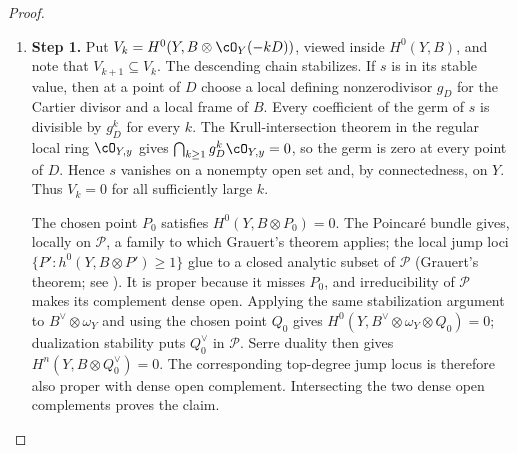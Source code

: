 \begin{proof}
\begin{enumerate}[label={$\langle1\rangle$\arabic*.},leftmargin=*]
\item 
\noindent\textbf{Step 1.} Put
  \(V_k=H^0(Y,B\otimes\cO_Y(-kD))\), viewed inside $H^0(Y,B)$, and note
  that $V_{k+1}\subseteq V_k$.  The descending chain stabilizes.  If $s$ is
  in its stable value, then at a point of $D$ choose a local defining
  nonzerodivisor $g_D$ for the Cartier divisor and a local frame of $B$.
  Every coefficient of the germ of $s$ is divisible by $g_D^k$ for every
  $k$.  The Krull-intersection theorem in the regular local ring
  $\cO_{Y,y}$ gives $\bigcap_{k\ge1}g_D^k\cO_{Y,y}=0$, so the germ is zero at
  every point of $D$.  Hence $s$ vanishes on a nonempty open set and, by
  connectedness, on $Y$.  Thus $V_k=0$ for all sufficiently large $k$.

  The chosen point $P_0$ satisfies
  $H^0(Y,B\otimes P_0)=0$.  The Poincar\'e bundle gives, locally on
$\mathcal P$, a family to which Grauert's theorem applies; the local jump
  loci $\{P':h^0(Y,B\otimes P')\ge1\}$ glue to a closed analytic subset of
  $\mathcal P$ (Grauert's theorem; see \cite{Grauert1960D,BS76push}).  It is proper because it misses $P_0$, and irreducibility of
$\mathcal P$ makes its complement dense open.  Applying the same stabilization
argument to $B^\vee\otimes\omega_Y$ and using the chosen point $Q_0$ gives
$H^0(Y,B^\vee\otimes\omega_Y\otimes Q_0)=0$; dualization stability puts
$Q_0^\vee$ in $\mathcal P$.  Serre duality then gives
$H^n(Y,B\otimes Q_0^\vee)=0$.  The corresponding top-degree jump locus is
therefore also proper with dense open complement.  Intersecting the two
dense open complements proves the claim.

\end{enumerate}
\end{proof}
